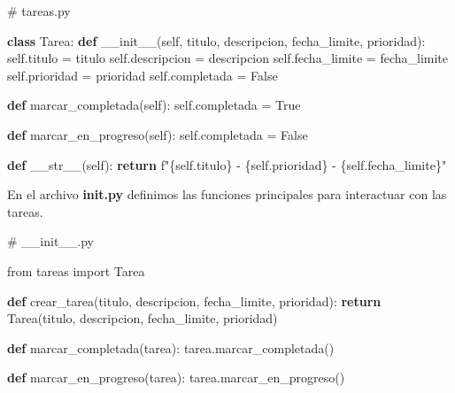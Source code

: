 \documentclass[
  a4paper,
  DIV=11,
  numbers=noendperiod,
  onepage,
  openany]{scrreprt}
\newenvironment{Shaded}{\begin{snugshade}}{\end{snugshade}}
\newcommand{\CommentTok}[1]{\textcolor[rgb]{0.37,0.37,0.37}{#1}}
\newcommand{\ControlFlowTok}[1]{\textcolor[rgb]{0.00,0.23,0.31}{\textbf{#1}}}
\newcommand{\FunctionTok}[1]{\textcolor[rgb]{0.28,0.35,0.67}{#1}}
\newcommand{\ImportTok}[1]{\textcolor[rgb]{0.00,0.46,0.62}{#1}}
\newcommand{\KeywordTok}[1]{\textcolor[rgb]{0.00,0.23,0.31}{\textbf{#1}}}
\newcommand{\NormalTok}[1]{\textcolor[rgb]{0.00,0.23,0.31}{#1}}
\newcommand{\OperatorTok}[1]{\textcolor[rgb]{0.37,0.37,0.37}{#1}}
\newcommand{\SpecialCharTok}[1]{\textcolor[rgb]{0.37,0.37,0.37}{#1}}
\newcommand{\SpecialStringTok}[1]{\textcolor[rgb]{0.13,0.47,0.30}{#1}}
\newcommand{\VariableTok}[1]{\textcolor[rgb]{0.07,0.07,0.07}{#1}}
\begin{document}
\begin{Shaded}
\begin{Highlighting}[]
\CommentTok{\# tareas.py}

\KeywordTok{class}\NormalTok{ Tarea:}
    \KeywordTok{def} \FunctionTok{\_\_init\_\_}\NormalTok{(}\VariableTok{self}\NormalTok{, titulo, descripcion, fecha\_limite, prioridad):}
        \VariableTok{self}\NormalTok{.titulo }\OperatorTok{=}\NormalTok{ titulo}
        \VariableTok{self}\NormalTok{.descripcion }\OperatorTok{=}\NormalTok{ descripcion}
        \VariableTok{self}\NormalTok{.fecha\_limite }\OperatorTok{=}\NormalTok{ fecha\_limite}
        \VariableTok{self}\NormalTok{.prioridad }\OperatorTok{=}\NormalTok{ prioridad}
        \VariableTok{self}\NormalTok{.completada }\OperatorTok{=} \VariableTok{False}

    \KeywordTok{def}\NormalTok{ marcar\_completada(}\VariableTok{self}\NormalTok{):}
        \VariableTok{self}\NormalTok{.completada }\OperatorTok{=} \VariableTok{True}

    \KeywordTok{def}\NormalTok{ marcar\_en\_progreso(}\VariableTok{self}\NormalTok{):}
        \VariableTok{self}\NormalTok{.completada }\OperatorTok{=} \VariableTok{False}

    \KeywordTok{def} \FunctionTok{\_\_str\_\_}\NormalTok{(}\VariableTok{self}\NormalTok{):}
        \ControlFlowTok{return} \SpecialStringTok{f"}\SpecialCharTok{\{}\VariableTok{self}\SpecialCharTok{.}\NormalTok{titulo}\SpecialCharTok{\}}\SpecialStringTok{ {-} }\SpecialCharTok{\{}\VariableTok{self}\SpecialCharTok{.}\NormalTok{prioridad}\SpecialCharTok{\}}\SpecialStringTok{ {-} }\SpecialCharTok{\{}\VariableTok{self}\SpecialCharTok{.}\NormalTok{fecha\_limite}\SpecialCharTok{\}}\SpecialStringTok{"}
\end{Highlighting}
\end{Shaded}

En el archivo \textbf{\textbf{init}.py} definimos las funciones
principales para interactuar con las tareas.

\begin{Shaded}
\begin{Highlighting}[]
\CommentTok{\# \_\_init\_\_.py}

\ImportTok{from}\NormalTok{ tareas }\ImportTok{import}\NormalTok{ Tarea}

\KeywordTok{def}\NormalTok{ crear\_tarea(titulo, descripcion, fecha\_limite, prioridad):}
    \ControlFlowTok{return}\NormalTok{ Tarea(titulo, descripcion, fecha\_limite, prioridad)}

\KeywordTok{def}\NormalTok{ marcar\_completada(tarea):}
\NormalTok{    tarea.marcar\_completada()}

\KeywordTok{def}\NormalTok{ marcar\_en\_progreso(tarea):}
\NormalTok{    tarea.marcar\_en\_progreso()}
\end{Highlighting}
\end{Shaded}
\end{document}
